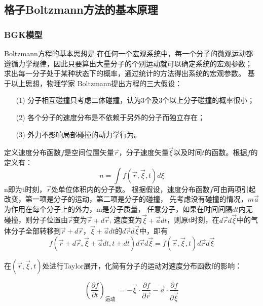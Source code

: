 \subsection{格子Boltzmann方法的基本原理}

\subsubsection{BGK模型}
Boltzmann方程的基本思想是
在任何一个宏观系统中，每一个分子的微观运动都遵循力学规律，因此只要算出大量分子的个别运动就可以确定系统的宏观参数；
求出每一分子处于某种状态下的概率，通过统计的方法得出系统的宏观参数。 
基于以上思想，物理学家 Boltzmann提出方程的三大假设：
\begin{itemize}
	\item[(1)] 分子相互碰撞只考虑二体碰撞，认为3个及3个以上分子碰撞的概率很小；
	\item[(2)] 各个分子的速度分布是不依赖于另外的分子而独立存在；
	\item[(3)] 外力不影响局部碰撞的动力学行为。 	
\end{itemize}

定义速度分布函数$f$是空间位置矢量$\vec{r}$，分子速度矢量$\vec{\xi}$以及时间$t$的函数。根据$f$的定义有：
\begin{equation}n=\int f(\vec{r}, \vec{\xi}, t) d \xi\end{equation}
\noindent n即为t时刻，$\vec{r}$处单位体积内的分子数。
根据假设，速度分布函数$f$可由两项引起改变，第一项是分子的运动，第二项是分子的碰撞，
先考虑没有碰撞的情况，$m \vec{a}$为作用在每个分子上的外力，m是分子质量，
任意分子，如果在时间间隔$d t$内无碰撞，则分子位置由$\vec{r}$变为$\vec{r}+d \vec{r}$,
速度变为$\vec{\xi}+\vec{a} d t$，则原t时刻，在$d \vec{r} d \vec{\xi}$中的气体分子全部转移到$\vec{r}+d \vec{r}$，$\vec{\xi}+\vec{a} d t$的$d \vec{r} d \vec{\xi}$中，即有
\begin{equation}f(\vec{r}+d \vec{r}, \vec{\xi}+\vec{a} d t, t+d t) d \vec{r} d \vec{\xi}=f(\vec{r}, \vec{\xi}, t) d \vec{r} d \vec{\xi}\end{equation}

\noindent 在$(\vec{r}, \vec{\xi}, t)$处进行Taylor展开，化简有分子的运动对速度分布函数f的影响：

\begin{equation}
\label{运动}
\left(\frac{\partial f}{\partial t}\right)_{\text {运动 }}=-\vec{\xi} \cdot \frac{\partial f}{\partial \vec{r}}-\vec{a} \cdot \frac{\partial f}{\partial \vec{\xi}}\end{equation}

